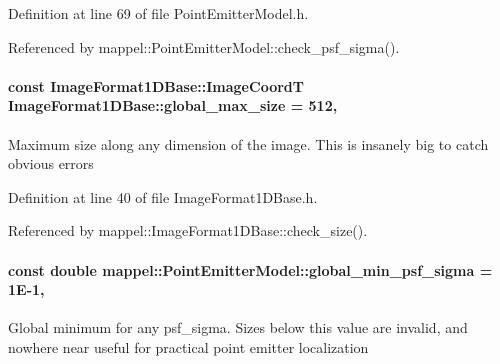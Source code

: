 Definition at line 69 of file Point\+Emitter\+Model.\+h.



Referenced by mappel\+::\+Point\+Emitter\+Model\+::check\+\_\+psf\+\_\+sigma().

\paragraph[{\texorpdfstring{global\+\_\+max\+\_\+size}{global_max_size}}]{\setlength{\rightskip}{0pt plus 5cm}const {\bf Image\+Format1\+D\+Base\+::\+Image\+CoordT} Image\+Format1\+D\+Base\+::global\+\_\+max\+\_\+size = 512\hspace{0.3cm}{\ttfamily [static]}, {\ttfamily [inherited]}}\hypertarget{classmappel_1_1ImageFormat1DBase_a5aafad20e635eae6f3609af56abad3ad}{}\label{classmappel_1_1ImageFormat1DBase_a5aafad20e635eae6f3609af56abad3ad}
Maximum size along any dimension of the image. This is insanely big to catch obvious errors 

Definition at line 40 of file Image\+Format1\+D\+Base.\+h.



Referenced by mappel\+::\+Image\+Format1\+D\+Base\+::check\+\_\+size().

\paragraph[{\texorpdfstring{global\+\_\+min\+\_\+psf\+\_\+sigma}{global_min_psf_sigma}}]{\setlength{\rightskip}{0pt plus 5cm}const double mappel\+::\+Point\+Emitter\+Model\+::global\+\_\+min\+\_\+psf\+\_\+sigma = 1\+E-\/1\hspace{0.3cm}{\ttfamily [static]}, {\ttfamily [inherited]}}\hypertarget{classmappel_1_1PointEmitterModel_a77d0ca98d77cb8b94117ece2a5b182a4}{}\label{classmappel_1_1PointEmitterModel_a77d0ca98d77cb8b94117ece2a5b182a4}
Global minimum for any psf\+\_\+sigma. Sizes below this value are invalid, and nowhere near useful for practical point emitter localization 

